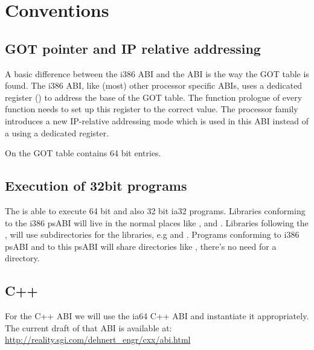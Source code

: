
\chapter{Conventions}



\section{GOT pointer and IP relative addressing}

A basic difference between the i386 ABI and the \xARCH ABI is the
way the GOT table is found.  The i386 ABI, like (most) other processor
specific ABIs, uses a dedicated register () to address the
base of the GOT table.  The function prologue of every function needs
to set up this register to the correct value.  The \xARCH processor
family introduces a new IP-relative addressing mode which is used in
this ABI instead of a using a dedicated register.

On \xARCH the GOT table contains 64 bit entries.

\section{Execution of 32bit programs}


The \xARCH is able to execute 64 bit \xARCH and also 32 bit ia32
programs.  Libraries conforming to the i386 psABI will live in the
normal places like ,  and .
Libraries following the \xARCH, will use  subdirectories
for the libraries, e.g  and .  Programs
conforming to i386 psABI and to this \xARCH psABI will share
directories like , there's no need for a 
directory.


\section{C++\label{section-cpp}}

For the C++ ABI we will use the ia64 C++ ABI and instantiate it
appropriately.  The current draft of that ABI is available at:\\
\url{http://reality.sgi.com/dehnert_engr/cxx/abi.html}


